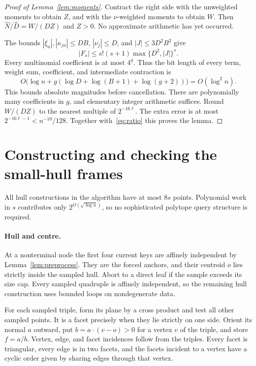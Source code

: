 \documentclass[notab,a4paper,UKenglish,numberwithinsect]{socg-lipics-v2021}
\begin{document}
\begin{proof}[Proof of Lemma~\ref{lem:moments}]
Contract the right side with the unweighted moments to obtain $Z$, and with the $\nu$-weighted moments to obtain $W$. Then $\widehat N/\widehat D=W/(DZ)$ and $Z>0$. No approximate arithmetic has yet occurred.

The bounds $|\xi_a|,|\kappa_{ja}|\le DB$, $|\nu_j|\le D$, and $|J|\le3D^2B^2$ give
\[
 |F_s|\le s!(s+1)\max\{D^2,|J|\}^s.
\]
Every multinomial coefficient is at most $4^g$. Thus the bit length of every term, weight sum, coefficient, and intermediate contraction is
\[
 O\bigl(\log n+g(\log D+\log(B+1)+\log(g+2))\bigr)
       =O(\log^2 n).
\]
This bounds absolute magnitudes before cancellation. There are polynomially many coefficients in $g$, and elementary integer arithmetic suffices. Round $W/(DZ)$ to the nearest multiple of $2^{-16\ell}$. The extra error is at most $2^{-16\ell-1}<n^{-10}/128$. Together with~\eqref{eq:ratio} this proves the lemma.
\end{proof}

\section{Constructing and checking the small-hull frames}\label{app:frames}
All hull constructions in the algorithm have at most $8s$ points. Polynomial work in $s$ contributes only $2^{O(\sqrt{\log n})}$, so no sophisticated polytope query structure is required.

\paragraph*{Hull and centre.}
At a nonterminal node the first four current keys are affinely independent by Lemma~\ref{lem:preprocess}. They are the forced anchors, and their centroid $o$ lies strictly inside the sampled hull. Abort to a direct leaf if the sample exceeds its size cap. Every sampled quadruple is affinely independent, so the remaining hull construction uses bounded loops on nondegenerate data.

For each sampled triple, form its plane by a cross product and test all other sampled points. It is a facet precisely when they lie strictly on one side. Orient its normal $a$ outward, put $b=a\cdot(v-o)>0$ for a vertex $v$ of the triple, and store $f=a/b$. Vertex, edge, and facet incidences follow from the triples. Every facet is triangular, every edge is in two facets, and the facets incident to a vertex have a cyclic order given by sharing edges through that vertex.
\end{document}
